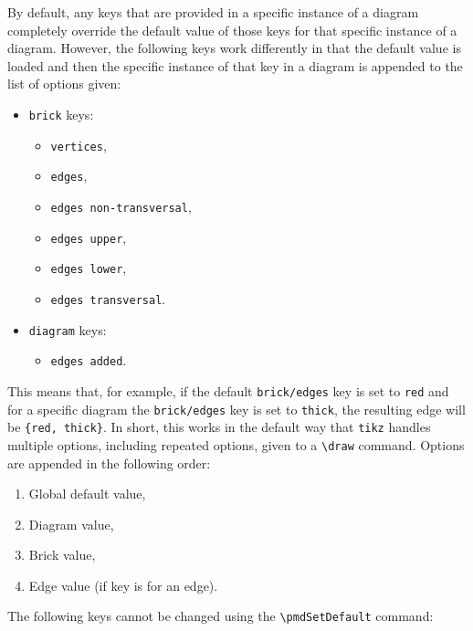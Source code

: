 \documentclass{ltxdoc}
\begin{document}
By default, any keys that are provided in a specific instance of a diagram completely override the default value of those keys for that specific instance of a diagram. However, the following keys work differently in that the default value is loaded and then the specific instance of that key in a diagram is appended to the list of options given:
\begin{itemize}
    \item \texttt{brick} keys:
    \begin{itemize}
        \item \texttt{vertices},
        \item \texttt{edges},
        \item \texttt{edges non-transversal},
        \item \texttt{edges upper},
        \item \texttt{edges lower},
        \item \texttt{edges transversal}.
    \end{itemize}
    \item \texttt{diagram} keys:
    \begin{itemize}
        \item \texttt{edges added}.
    \end{itemize}
\end{itemize}
This means that, for example, if the default \texttt{brick/edges} key is set to \texttt{red} and for a specific diagram the \texttt{brick/edges} key is set to \texttt{thick}, the resulting edge will be \verb`{red, thick}`. In short, this works in the default way that \texttt{tikz} handles multiple options, including repeated options, given to a \verb`\draw` command. Options are appended in the following order:
\begin{enumerate}
    \item Global default value,
    \item Diagram value,
    \item Brick value,
    \item Edge value (if key is for an edge).
\end{enumerate}
The following keys cannot be changed using the \verb`\pmdSetDefault` command:
\end{document}
